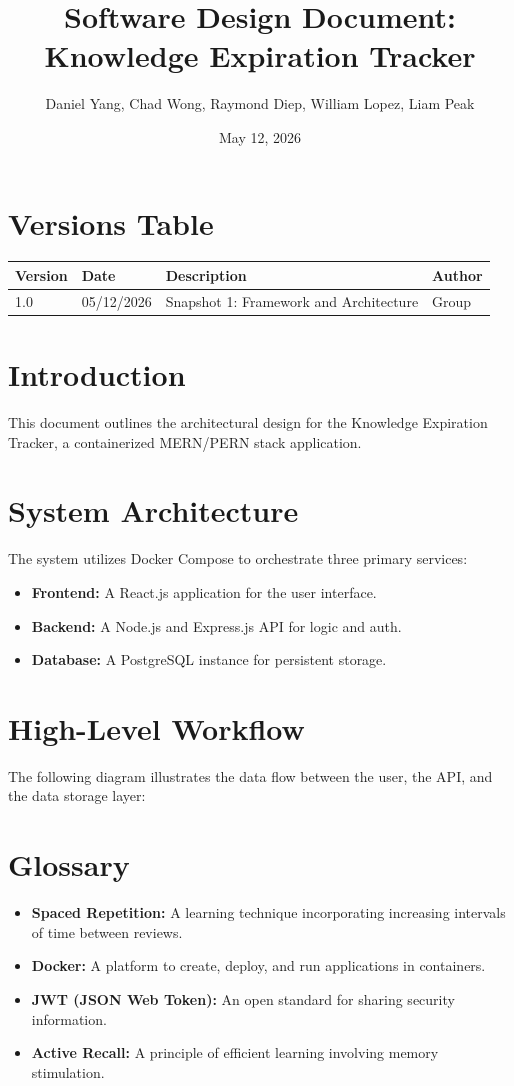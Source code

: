 \documentclass{article}
\title{Software Design Document: Knowledge Expiration Tracker}
\author{Daniel Yang, Chad Wong, Raymond Diep, William Lopez, Liam Peak}
\date{May 12, 2026}
\begin{document}
\maketitle
\newpage
\tableofcontents
\newpage

\section{Versions Table}
\begin{tabular}{|l|l|l|l|}
\hline
\textbf{Version} & \textbf{Date} & \textbf{Description} & \textbf{Author} \\ \hline
1.0 & 05/12/2026 & Snapshot 1: Framework and Architecture & Group \\ \hline
\end{tabular}

\section{Introduction}
This document outlines the architectural design for the Knowledge Expiration Tracker, a containerized MERN/PERN stack application.

\section{System Architecture}
The system utilizes Docker Compose to orchestrate three primary services:
\begin{itemize}
    \item \textbf{Frontend:} A React.js application for the user interface.
    \item \textbf{Backend:} A Node.js and Express.js API for logic and auth.
    \item \textbf{Database:} A PostgreSQL instance for persistent storage.
\end{itemize}

\section{High-Level Workflow}
The following diagram illustrates the data flow between the user, the API, and the data storage layer:

\section{Glossary}
\begin{itemize}
    \item \textbf{Spaced Repetition:} A learning technique incorporating increasing intervals of time between reviews.
    \item \textbf{Docker:} A platform to create, deploy, and run applications in containers.
    \item \textbf{JWT (JSON Web Token):} An open standard for sharing security information.
    \item \textbf{Active Recall:} A principle of efficient learning involving memory stimulation.
\end{itemize}
\end{document}
